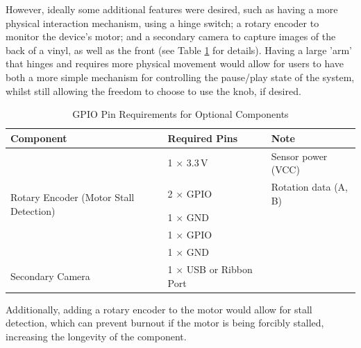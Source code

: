                 However, ideally some additional features were desired, such as having a more physical interaction mechanism, using a hinge switch; a rotary encoder to monitor the device's motor; and a secondary camera to capture images of the back of a vinyl, as well as the front (see Table \ref{tab:optionalGPIOPins} for details). Having a large 'arm' that hinges and requires more physical movement would allow for users to have both a more simple mechanism for controlling the pause/play state of the system, whilst still allowing the freedom to choose to use the knob, if desired.
    
                \begin{table}[htbp]
                    \centering
                    \caption{GPIO Pin Requirements for Optional Components}
                    \label{tab:optionalGPIOPins}
                    \begin{tabular}{|l|l|l|}
                        \hline
                        \textbf{Component} & \textbf{Required Pins} & \textbf{Note}\\ \hline
                        \multirow{5}{*}{Rotary Encoder (Motor Stall Detection)} & 1 × 3.3\,V & Sensor power (VCC)\\ \cline{2-3}
                                                                                & 2 × GPIO & Rotation data (A, B) \\ \cline{2-3}
                                                                                & 1 × GND & \\ \hline
                        \multirow{2}{*}{Hinge Switch} & 1 × GPIO & \\ \cline{2-3}
                                                      & 1 × GND & \\ \hline
                        Secondary Camera & 1 × USB or Ribbon Port & \\ \hline
                    \end{tabular}
                \end{table}
    
                Additionally, adding a rotary encoder to the motor would allow for stall detection, which can prevent burnout if the motor is being forcibly stalled, increasing the longevity of the component.
    
